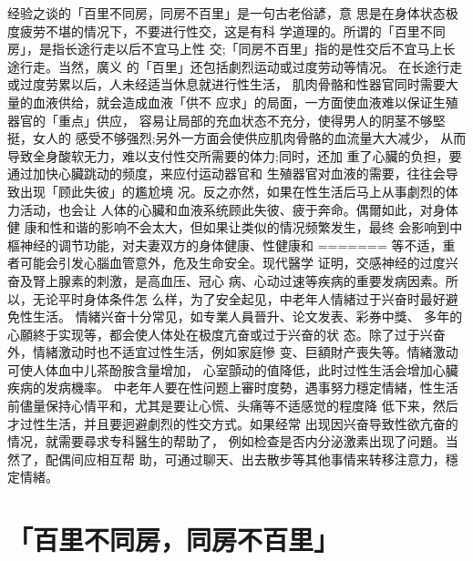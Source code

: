 \documentclass[12pt,UTF8]{ctexbook}
\begin{document}
经验之谈的「百里不同房，同房不百里」是一句古老俗諺，意
思是在身体状态极度疲劳不堪的情况下，不要进行性交，这是有科
学道理的。所谓的「百里不同房」，是指长途行走以后不宜马上性
交;「同房不百里」指的是性交后不宜马上长途行走。当然，廣义
的「百里」还包括劇烈运动或过度劳动等情况。
在长途行走或过度劳累以后，人未经适当休息就进行性生活，
肌肉骨骼和性器官同时需要大量的血液供给，就会造成血液「供不
应求」的局面，一方面使血液难以保证生殖器官的「重点」供应，
容易让局部的充血状态不充分，使得男人的阴茎不够堅挺，女人的
感受不够强烈;另外一方面会使供应肌肉骨骼的血流量大大减少，
从而导致全身酸软无力，难以支付性交所需要的体力;同时，还加
重了心臟的负担，要通过加快心臟跳动的频度，来应付运动器官和
生殖器官对血液的需要，往往会导致出现「顾此失彼」的尷尬境
况。反之亦然，如果在性生活后马上从事劇烈的体力活动，也会让
人体的心臟和血液系统顾此失彼、疲于奔命。偶爾如此，对身体健
康和性和谐的影响不会太大，但如果让类似的情况频繁发生，最终
会影响到中樞神经的调节功能，对夫妻双方的身体健康、性健康和
=======
等不适，重者可能会引发心腦血管意外，危及生命安全。现代醫学
证明，交感神经的过度兴奋及腎上腺素的刺激，是高血压、冠心
病、心动过速等疾病的重要发病因素。所以，无论平时身体条件怎
么样，为了安全起见，中老年人情緒过于兴奋时最好避免性生活。
情緒兴奋十分常见，如专業人員晉升、论文发表、彩券中獎、
多年的心願終于实现等，都会使人体处在极度亢奋或过于兴奋的状
态。除了过于兴奋外，情緒激动时也不适宜过性生活，例如家庭慘
变、巨額財产喪失等。情緒激动可使人体血中儿茶酚胺含量增加，
心室顫动的值降低，此时过性生活会增加心臟疾病的发病機率。
中老年人要在性问题上審时度勢，遇事努力穩定情緒，性生活
前儘量保持心情平和，尤其是要让心慌、头痛等不适感觉的程度降
低下来，然后才过性生活，并且要迥避劇烈的性交方式。如果经常
出现因兴奋导致性欲亢奋的情况，就需要尋求专科醫生的帮助了，
例如检查是否内分泌激素出现了问題。当然了，配偶间应相互帮
助，可通过聊天、出去散步等其他事情来转移注意力，穩定情緒。

\section{「百里不同房，同房不百里」}
\end{document}
